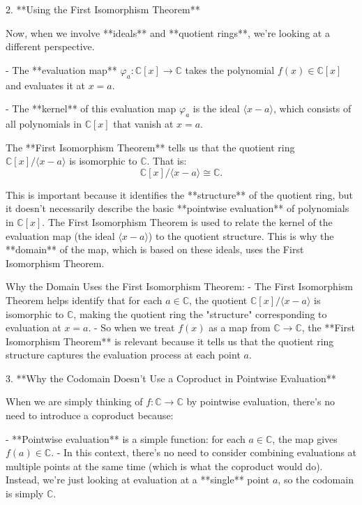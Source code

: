 \documentclass[11pt,openany]{article}
\begin{document}
2. **Using the First Isomorphism Theorem**

Now, when we involve **ideals** and **quotient rings**, we're looking at a different perspective.

- The **evaluation map** \( \varphi_a: \mathbb{C}[x] \to \mathbb{C} \) takes the polynomial \( f(x) \in \mathbb{C}[x] \) and evaluates it at \( x = a \).

- The **kernel** of this evaluation map \( \varphi_a \) is the ideal \( \langle x - a \rangle \), which consists of all polynomials in \( \mathbb{C}[x] \) that vanish at \( x = a \).

The **First Isomorphism Theorem** tells us that the quotient ring \( \mathbb{C}[x] / \langle x - a \rangle \) is isomorphic to \( \mathbb{C} \). That is:
\[
\mathbb{C}[x] / \langle x - a \rangle \cong \mathbb{C}.
\]

This is important because it identifies the **structure** of the quotient ring, but it doesn’t necessarily describe the basic **pointwise evaluation** of polynomials in \( \mathbb{C}[x] \). The First Isomorphism Theorem is used to relate the kernel of the evaluation map (the ideal \( \langle x - a \rangle \)) to the quotient structure. This is why the **domain** of the map, which is based on these ideals, uses the First Isomorphism Theorem.

Why the Domain Uses the First Isomorphism Theorem:
- The First Isomorphism Theorem helps identify that for each \( a \in \mathbb{C} \), the quotient \( \mathbb{C}[x] / \langle x - a \rangle \) is isomorphic to \( \mathbb{C} \), making the quotient ring the "structure" corresponding to evaluation at \( x = a \).
- So when we treat \( f(x) \) as a map from \( \mathbb{C} \to \mathbb{C} \), the **First Isomorphism Theorem** is relevant because it tells us that the quotient ring structure captures the evaluation process at each point \( a \).

3. **Why the Codomain Doesn’t Use a Coproduct in Pointwise Evaluation**

When we are simply thinking of \( f: \mathbb{C} \to \mathbb{C} \) by pointwise evaluation, there's no need to introduce a coproduct because:

- **Pointwise evaluation** is a simple function: for each \( a \in \mathbb{C} \), the map gives \( f(a) \in \mathbb{C} \). 
- In this context, there's no need to consider combining evaluations at multiple points at the same time (which is what the coproduct would do). Instead, we're just looking at evaluation at a **single** point \( a \), so the codomain is simply \( \mathbb{C} \).
\end{document}
